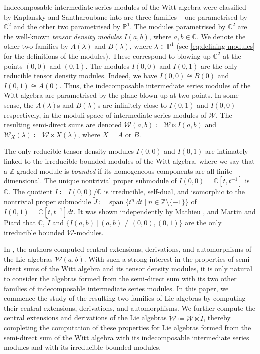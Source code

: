 \documentclass[11pt, svgnames]{amsart}
\DeclareMathOperator{\spn}{span}
\newcommand{\ZZ}{\mathbb{Z}}
\newcommand{\CC}{\mathbb{C}}
\newcommand{\PP}{\mathbb{P}}
\newcommand{\W}{\mathcal{W}}
\theoremstyle{definition}
\begin{document}
Indecomposable intermediate series modules of the Witt algebra were classified by Kaplansky and Santharoubane \cite{KaplanskySantharoubane} into are three families -- one parametrised by $\CC^2$ and the other two parametrised by $\PP^1$. The modules parametrised by $\CC^2$ are the well-known \emph{tensor density modules} $I(a,b)$, where $a,b \in \CC$. We denote the other two families by $A(\lambda)$ and $B(\lambda)$, where $\lambda \in \PP^1$ (see \eqref{eq:defining modules} for the definitions of the modules). These correspond to blowing up $\CC^2$ at the points $(0,0)$ and $(0,1)$. The modules $I(0,0)$ and $I(0,1)$ are the only reducible tensor density modules. Indeed, we have $I(0,0) \cong B(0)$ and $I(0,1) \cong A(0)$. Thus, the indecomposable intermediate series modules of the Witt algebra are parametrised by the plane blown up at two points. In some sense, the $A(\lambda)$s and $B(\lambda)$s are infinitely close to $I(0,1)$ and $I(0,0)$ respectively, in the moduli space of intermediate series modules of $\W$. The resulting semi-direct sums are denoted $\W(a,b) \coloneqq \W \ltimes I(a,b)$ and $\W_X(\lambda) \coloneqq \W \ltimes X(\lambda)$, where $X = A$ or $B$.

The only reducible tensor density modules $I(0,0)$ and $I(0,1)$ are intimately linked to the irreducible bounded modules of the Witt algebra, where we say that a $\ZZ$-graded module is \emph{bounded} if its homogeneous components are all finite-dimensional. The unique nontrivial proper submodule of $I(0,0) = \CC[t,t^{-1}]$ is $\CC$. The quotient $\widetilde{I} \coloneqq I(0,0)/\CC$ is irreducible, self-dual, and isomorphic to the nontrivial proper submodule $\widetilde{J} \coloneqq \spn\{t^n \ dt \mid n \in \ZZ \setminus \{-1\}\}$ of $I(0,1) = \CC[t,t^{-1}]dt$. It was shown independently by Mathieu \cite{Mathieu}, and Martin and Piard \cite{MartinPiard} that $\CC$, $\widetilde{I}$ and $\{I(a,b)\ | \ (a,b)\neq(0,0),(0,1)\}$ are the only irreducible bounded $\W$-modules.

In \cite{GaoJiangPei}, the authors computed central extensions, derivations, and automorphisms of the Lie algebras $\W(a,b)$. With such a strong interest in the properties of semi-direct sums of the Witt algebra and its tensor density modules, it is only natural to consider the algebras formed from the semi-direct sum with its two other families of indecomposable intermediate series modules. In this paper, we commence the study of the resulting two families of Lie algebras by computing their central extensions, derivations, and automorphisms. We further compute the central extensions and derivations of the Lie algebras $\widetilde{\W} \coloneqq \W \ltimes \widetilde{I}$, thereby completing the computation of these properties for Lie algebras formed from the semi-direct sum of the Witt algebra with its indecomposable intermediate series modules and with its irreducible bounded modules.
\end{document}
